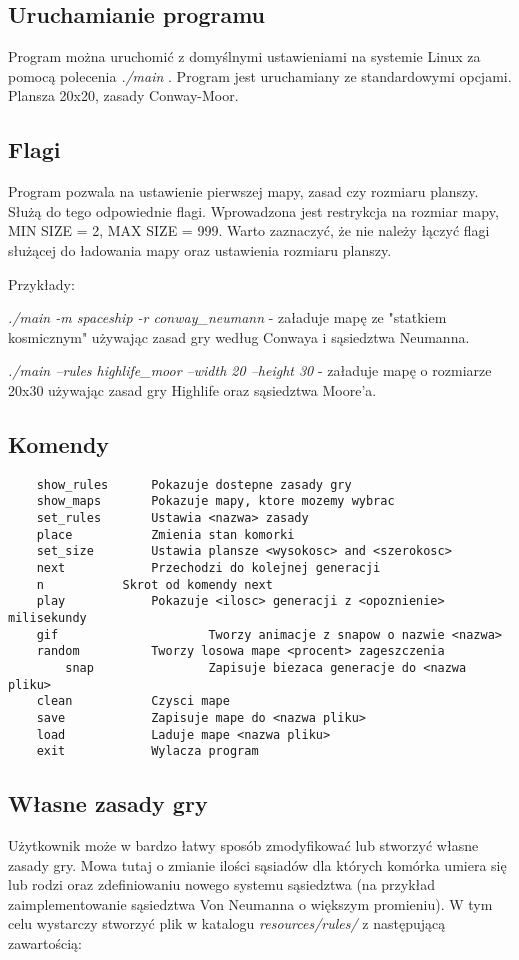 \documentclass{article}
\begin{document}
\subsection{Uruchamianie programu}
Program można uruchomić z domyślnymi ustawieniami na systemie Linux za pomocą polecenia \textit{./main} . Program jest uruchamiany ze standardowymi opcjami.
Plansza 20x20, zasady Conway-Moor.
\subsection{Flagi}
Program pozwala na ustawienie pierwszej mapy, zasad czy rozmiaru planszy.
Służą do tego odpowiednie flagi. Wprowadzona jest restrykcja na rozmiar mapy, MIN SIZE = 2, MAX SIZE = 999. 
 Warto zaznaczyć, że nie należy łączyć flagi służącej do ładowania mapy oraz ustawienia rozmiaru planszy.

Przykłady: 

\textit{./main -m spaceship -r conway\_neumann} - załaduje mapę ze "statkiem kosmicznym" używając zasad gry według Conwaya i sąsiedztwa Neumanna.

\textit{./main --rules highlife\_moor --width 20 --height 30} - załaduje mapę o rozmiarze 20x30 używając zasad gry Highlife oraz sąsiedztwa Moore'a.
\subsection{Komendy}
\begin{lstlisting}
	show_rules 		Pokazuje dostepne zasady gry
	show_maps 		Pokazuje mapy, ktore mozemy wybrac
	set_rules		Ustawia <nazwa> zasady 
	place			Zmienia stan komorki
	set_size 		Ustawia plansze <wysokosc> and <szerokosc>
	next    		Przechodzi do kolejnej generacji
	n 			Skrot od komendy next
	play 			Pokazuje <ilosc> generacji z <opoznienie> milisekundy 
	gif                     Tworzy animacje z snapow o nazwie <nazwa>
	random 			Tworzy losowa mape <procent> zageszczenia
        snap		        Zapisuje biezaca generacje do <nazwa pliku>
	clean 			Czysci mape
	save			Zapisuje mape do <nazwa pliku>
	load			Laduje mape <nazwa pliku>
	exit 			Wylacza program
\end{lstlisting}
\subsection{Własne zasady gry}
Użytkownik może w bardzo łatwy sposób zmodyfikować lub stworzyć własne zasady gry. Mowa tutaj o zmianie ilości sąsiadów dla których komórka umiera się lub rodzi oraz zdefiniowaniu nowego systemu sąsiedztwa (na przykład zaimplementowanie sąsiedztwa Von Neumanna o większym promieniu). W tym celu wystarczy stworzyć plik w katalogu \textit{resources/rules/} z następującą zawartością:
\end{document}
